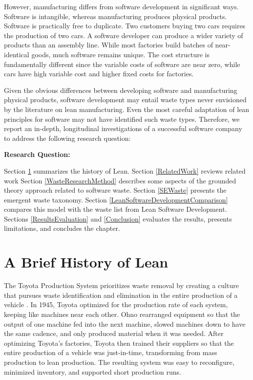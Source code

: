 However, manufacturing differs from software development in significant ways. Software is intangible, whereas manufacturing produces physical products. Software is practically free to duplicate. Two customers buying two cars requires the production of two cars. A software developer can produce a wider variety of products than an assembly line. While most factories build batches of near-identical goods, much software remains unique. The cost structure is fundamentally different since the variable costs of software are near zero, while cars have high variable cost and higher fixed costs for factories. 

Given the obvious differences between developing software and manufacturing physical products, software development may entail waste types never envisioned by the literature on lean manufacturing. Even the most careful adaptation of lean principles for software may not have identified such waste types. Therefore, we report an in-depth, longitudinal investigations of a successful software company to address the following research question: 

\textbf{Research Question: }

Section \ref{HistoryOfLean} summarizes the history of Lean. Section \ref{RelatedWork} reviews related work Section \ref{WasteResearchMethod} describes some aspects of the grounded theory approach related to software waste. Section \ref{SEWaste} presents the emergent waste taxonomy. Section \ref{LeanSoftwareDevelopmentComparison} compares this model with the waste list from Lean Software Development. Sections \ref{ResultsEvaluation} and \ref{Conclusion} evaluates the results, presents limitations, and concludes the chapter.

\section{A Brief History of Lean}
\label{HistoryOfLean}

The Toyota Production System prioritizes waste removal by creating a culture that pursues waste identification and elimination in the entire production of a vehicle \cite{OhnoToyotaProductionSystem, ShingoToyotaProductionSystem}. In 1945, Toyota optimized for the production rate of each system, keeping like machines near each other. Ohno rearranged equipment so that the output of one machine fed into the next machine, slowed machines down to have the same cadence, and only produced material when it was needed. After optimizing Toyota's factories, Toyota then trained their suppliers so that the entire production of a vehicle was just-in-time, transforming from mass production to lean production. The resulting  system was easy to reconfigure, minimized inventory, and supported short production runs.  

